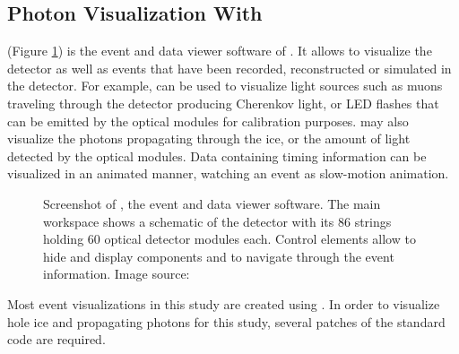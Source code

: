 
\subsection{Photon Visualization With \steamshovel}

\steamshovel (Figure \ref{fig:steamshovel}) is the event and data viewer
software of \icecube. It allows to visualize the \icecube detector as
well as events that have been recorded, reconstructed or simulated in
the detector. For example, \steamshovel can be used to visualize light
sources such as muons traveling through the detector producing Cherenkov
light, or LED flashes that can be emitted by the optical modules for
calibration purposes. \steamshovel may also visualize the photons
propagating through the ice, or the amount of light detected by the
optical modules. Data containing timing information can be visualized in
an animated manner, watching an event as slow-motion animation.

\begin{figure}[htbp]
  \caption{Screenshot of \steamshovel, the \icecube event and data viewer software. The main workspace shows a schematic of the \icecube detector with its 86 strings holding 60 optical detector modules each. Control elements allow to hide and display components and to navigate through the event information. Image source: \cite{steamshoveldocumentation}}
  \label{fig:steamshovel}
\end{figure}

Most event visualizations in this study are created using \steamshovel.
In order to visualize hole ice and propagating photons for this study,
several patches of the standard \steamshovel code are required.

